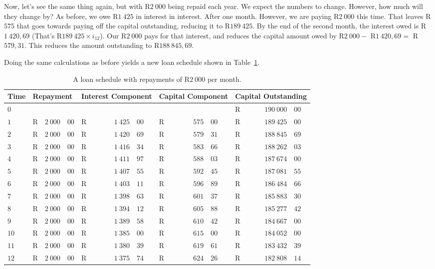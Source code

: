 Now, let's see the same thing again, but with R$2~000$ being repaid each year. We expect the numbers to change. However, how much will they change by? As before, we owe R$1~425$ in interest in interest. After one month. However, we are paying R$2~000$ this time. That leaves R$575$ that goes towards paying off the capital outstanding, reducing it to R$189~425$. By the end of the second month, the interest owed is R$1~420,69$ (That's R$189~425\times i_{12}$). Our R$2~000$ pays for that interest, and reduces the capital amount owed by R$2~000 -$ R$1~420,69 =$ R$579,31$. This reduces the amount outstanding to R$188~845,69$.

Doing the same calculations as before yields a new loan schedule shown in Table~\ref{tb:lschedule2}.

\begin{table}
\begin{center}
\begin{tabular}{|l|lr@{,}l|lr@{,}l|lr@{,}l|lr@{,}l|}
\hline
Time&\multicolumn{3}{l|}{Repayment}&\multicolumn{3}{p{2cm}|}{Interest Component}&\multicolumn{3}{p{2cm}|}{Capital Component}&\multicolumn{3}{p{2.5cm}|}{Capital Outstanding}\\
\hline
\hline
$0$&\multicolumn{3}{l|}{}&\multicolumn{3}{r|}{}&\multicolumn{3}{r|}{}&R&$190~000$&$00$\\
$1$&R&$2~000$&$00$&R&$1~425$&$00$&R&$575$&$00$&R&$189~425$&$00$\\
$2$&R&$2~000$&$00$&R&$1~420$&$69$&R&$579$&$31$&R&$188~845$&$69$\\
$3$&R&$2~000$&$00$&R&$1~416$&$34$&R&$583$&$66$&R&$188~262$&$03$\\
$4$&R&$2~000$&$00$&R&$1~411$&$97$&R&$588$&$03$&R&$187~674$&$00$\\
$5$&R&$2~000$&$00$&R&$1~407$&$55$&R&$592$&$45$&R&$187~081$&$55$\\
$6$&R&$2~000$&$00$&R&$1~403$&$11$&R&$596$&$89$&R&$186~484$&$66$\\
$7$&R&$2~000$&$00$&R&$1~398$&$63$&R&$601$&$37$&R&$185~883$&$30$\\
$8$&R&$2~000$&$00$&R&$1~394$&$12$&R&$605$&$88$&R&$185~277$&$42$\\
$9$&R&$2~000$&$00$&R&$1~389$&$58$&R&$610$&$42$&R&$184~667$&$00$\\
$10$&R&$2~000$&$00$&R&$1~385$&$00$&R&$615$&$00$&R&$184~052$&$00$\\
$11$&R&$2~000$&$00$&R&$1~380$&$39$&R&$619$&$61$&R&$183~432$&$39$\\
$12$&R&$2~000$&$00$&R&$1~375$&$74$&R&$624$&$26$&R&$182~808$&$14$\\
\hline
\end{tabular}
\end{center}
\caption{A loan schedule with repayments of R$2~000$ per month.}
\label{tb:lschedule2}
\end{table}

